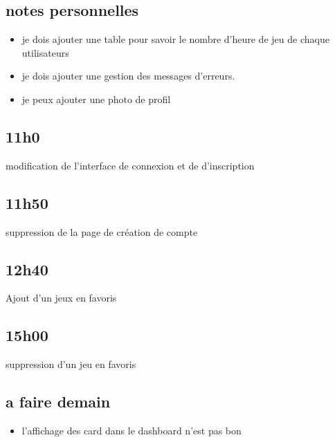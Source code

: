 \documentclass[a4paper,12pt,french]{sphinxmanual}
\begin{document}
\subsection{notes personnelles}
\label{\detokenize{logbook:notes-personnelles}}\begin{itemize}
\item {} 
\sphinxAtStartPar
je dois ajouter une table pour savoir le nombre d’heure de jeu de chaque utilisateurs

\item {} 
\sphinxAtStartPar
je dois ajouter une gestion des messages d’erreurs.

\item {} 
\sphinxAtStartPar
je peux ajouter une photo de profil

\end{itemize}


\subsection{11h0}
\label{\detokenize{logbook:h0}}
\sphinxAtStartPar
modification de l’interface de connexion et de d’inscription


\subsection{11h50}
\label{\detokenize{logbook:h50}}
\sphinxAtStartPar
suppression de la page de création de compte


\subsection{12h40}
\label{\detokenize{logbook:id17}}
\sphinxAtStartPar
Ajout d’un jeux en favoris


\subsection{15h00}
\label{\detokenize{logbook:id18}}
\sphinxAtStartPar
suppression d’un jeu en favoris


\subsection{a faire demain}
\label{\detokenize{logbook:a-faire-demain}}\begin{itemize}
\item {} 
\sphinxAtStartPar
l’affichage des card dans le dashboard n’est pas bon

\end{itemize}
\end{document}
